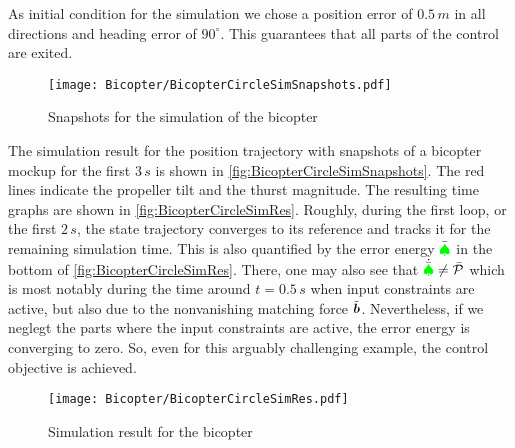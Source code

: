 As initial condition for the simulation we chose a position error of $0.5\,\unit{m}$ in all directions and heading error of $90^\circ$. 
This guarantees that all parts of the control are exited.

\begin{figure}[t]
 \centering
 \texttt{[image: Bicopter/BicopterCircleSimSnapshots.pdf]}
 \caption{Snapshots for the simulation of the bicopter}
 \label{fig:BicopterCircleSimSnapshots}
\end{figure}

The simulation result for the position trajectory with snapshots of a bicopter mockup for the first $3\,\unit{s}$ is shown in \autoref{fig:BicopterCircleSimSnapshots}.
The red lines indicate the propeller tilt and the thurst magnitude.
The resulting time graphs are shown in \autoref{fig:BicopterCircleSimRes}.
Roughly, during the first loop, or the first $2\,\unit{s}$, the state trajectory converges to its reference and tracks it for the remaining simulation time.
This is also quantified by the error energy $\bar{\textcolor{green}{\spadesuit}}$ in the bottom of \autoref{fig:BicopterCircleSimRes}.
There, one may also see that $\dot{\bar{\textcolor{green}{\spadesuit}}} \neq \bar{\mathcal{P}}$ which is most notably during the time around $t=0.5\,\unit{s}$ when input constraints are active, but also due to the nonvanishing matching force $\tilde{\boldsymbol{b}}$.
Nevertheless, if we neglegt the parts where the input constraints are active, the error energy is converging to zero.
So, even for this arguably challenging example, the control objective is achieved.

\begin{figure}[p]
 \centering
 \texttt{[image: Bicopter/BicopterCircleSimRes.pdf]}
 \caption{Simulation result for the bicopter}
 \label{fig:BicopterCircleSimRes}
\end{figure}
